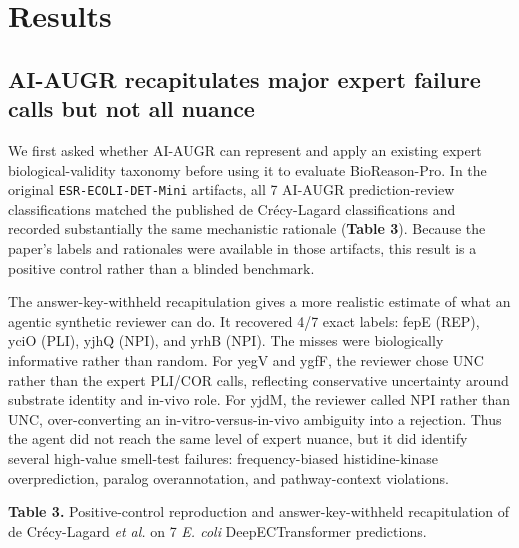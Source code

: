 \documentclass[
  11pt,
]{article}
\begin{document}
\hypertarget{results}{%
\section{Results}\label{results}}

\hypertarget{the-ai-augr-recapitulates-major-expert-failure-calls-but-not-all-nuance}{%
\subsection{AI-AUGR recapitulates major expert failure calls but not
all
nuance}\label{the-ai-augr-recapitulates-major-expert-failure-calls-but-not-all-nuance}}

We first asked whether AI-AUGR can represent and apply an existing expert
biological-validity taxonomy before using it to evaluate BioReason-Pro.
In the original \texttt{ESR-ECOLI-DET-Mini} artifacts, all 7 AI-AUGR
prediction-review classifications matched the published de Crécy-Lagard
classifications and recorded substantially the same mechanistic
rationale (\textbf{Table 3}). Because the paper's labels and rationales
were available in those artifacts, this result is a positive control
rather than a blinded benchmark.

The answer-key-withheld recapitulation gives a more realistic estimate
of what an agentic synthetic reviewer can do. It recovered 4/7 exact
labels: fepE (REP), yciO (PLI), yjhQ (NPI), and yrhB (NPI). The misses
were biologically informative rather than random. For yegV and ygfF, the
reviewer chose UNC rather than the expert PLI/COR calls, reflecting
conservative uncertainty around substrate identity and in-vivo role. For
yjdM, the reviewer called NPI rather than UNC, over-converting an
in-vitro-versus-in-vivo ambiguity into a rejection. Thus the agent did
not reach the same level of expert nuance, but it did identify several
high-value smell-test failures: frequency-biased histidine-kinase
overprediction, paralog overannotation, and pathway-context violations.

\textbf{Table 3.} Positive-control reproduction and answer-key-withheld
recapitulation of de Crécy-Lagard \emph{et al.} \cite{decrecylagard2025} on 7 \emph{E.
coli} DeepECTransformer predictions.
\end{document}

